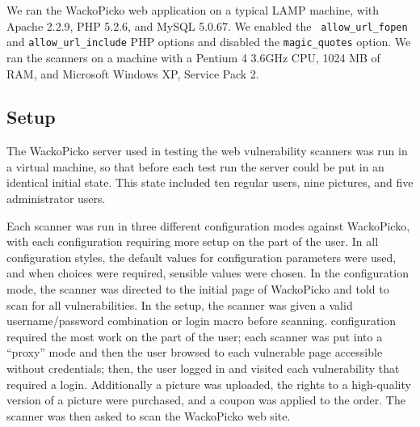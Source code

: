 We ran the WackoPicko web application on a typical LAMP machine, with
Apache 2.2.9, PHP 5.2.6, and MySQL 5.0.67. We enabled the {\tt
allow\_\-url\_\-fopen} and {\tt allow\_\-url\_\-include}  PHP options and disabled the  {\tt magic\_\-quotes} option.
We ran the scanners on a machine with a Pentium 4 3.6GHz CPU, 1024 MB of
RAM, and Microsoft Windows XP, Service Pack 2.
%

\subsection{Setup}
The WackoPicko server used in testing the web vulnerability scanners was run in a virtual
machine, so that before each test run the server could be put in an
identical initial state. This state included ten regular users, nine pictures,
and five administrator users.

Each scanner was run in three different configuration modes against
WackoPicko, with each configuration requiring more setup on the part of the
user. In all configuration styles, the default values for configuration parameters were used, and when choices
were required, sensible values were chosen. In the \initial{}
configuration mode, the scanner was
directed to the initial page of WackoPicko and told to scan for all
vulnerabilities. In the \config{} setup, the scanner was given a valid
username/password combination or login macro before scanning. 
\manual{} configuration required the most
work on the part of the user; each scanner was put into a ``proxy'' mode
and then the user browsed to each vulnerable page accessible without credentials; then, the user
logged in and visited each vulnerability that required a login.
Additionally a picture was uploaded, the rights to a high-quality version
of a picture were purchased, and a coupon was applied to the order. The
scanner was then asked to scan the WackoPicko web site.

